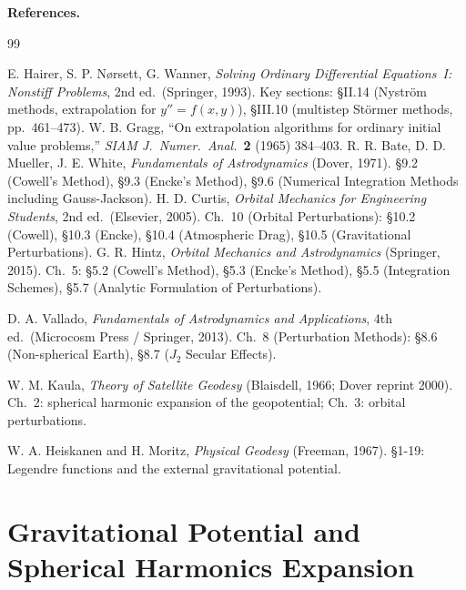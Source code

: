 \documentclass[11pt]{article}
\begin{document}
\bigskip\noindent
\textbf{References.}

\begin{thebibliography}{99}

 E. Hairer, S. P. N{\o}rsett, G. Wanner,
        \textit{Solving Ordinary Differential Equations~I: Nonstiff Problems},
        2nd ed.\ (Springer, 1993).
        Key sections: §II.14 (Nyström methods, extrapolation for $y''=f(x,y)$),
        §III.10 (multistep Störmer methods, pp.~461--473).
   W. B. Gragg, ``On extrapolation algorithms for ordinary initial value
        problems,'' \textit{SIAM J.\ Numer.\ Anal.}\ \textbf{2} (1965) 384--403.
 R. R. Bate, D. D. Mueller, J. E. White, \textit{Fundamentals of Astrodynamics} (Dover, 1971). \S9.2 (Cowell's Method), \S9.3 (Encke's Method), \S9.6 (Numerical Integration Methods including Gauss-Jackson).
 H. D. Curtis, \textit{Orbital Mechanics for Engineering Students}, 2nd ed.\ (Elsevier, 2005). Ch.~10 (Orbital Perturbations): \S10.2 (Cowell), \S10.3 (Encke), \S10.4 (Atmospheric Drag), \S10.5 (Gravitational Perturbations).
 G. R. Hintz, \textit{Orbital Mechanics and Astrodynamics} (Springer, 2015). Ch.~5: \S5.2 (Cowell's Method), \S5.3 (Encke's Method), \S5.5 (Integration Schemes), \S5.7 (Analytic Formulation of Perturbations).

 D. A. Vallado, \textit{Fundamentals of Astrodynamics and Applications},
        4th ed.\ (Microcosm Press / Springer, 2013).
        Ch.~8 (Perturbation Methods): \S8.6 (Non-spherical Earth), \S8.7 ($J_2$ Secular Effects).

 W. M. Kaula, \textit{Theory of Satellite Geodesy} (Blaisdell, 1966;
        Dover reprint 2000). Ch.~2: spherical harmonic expansion of the geopotential;
        Ch.~3: orbital perturbations.

 W. A. Heiskanen and H. Moritz,
        \textit{Physical Geodesy} (Freeman, 1967). \S1-19: Legendre functions and the
        external gravitational potential.

\end{thebibliography}

\section{Gravitational Potential and Spherical Harmonics Expansion}
\label{sec:gravity-harmonics}
\end{document}
